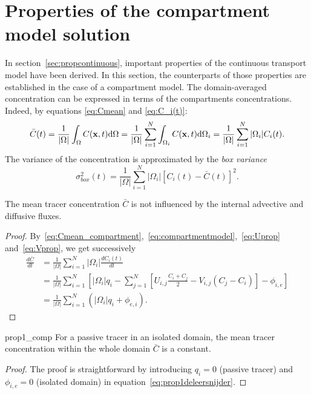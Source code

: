 \section{Properties of the compartment model solution} \label{sec:prop_comp}
In section~\ref{sec:propcontinuous}, important properties of the continuous transport model have been derived. In this section, the counterparts of those properties are established in the case of a compartment model. The domain-averaged concentration can be expressed in terms of the compartments concentrations. Indeed, by equations \eqref{eq:Cmean} and \eqref{eq:C_i(t)}:
\begin{equation} \label{eq:Cmean_compartment}
	\bar{C}(t) = \frac{1}{|\Omega|} \int_\Omega C(\mathbf x,t) \mathrm d\Omega = \frac{1}{|\Omega|} \sum_{i=1}^N \int_{\Omega_i} C(\mathbf x,t) \mathrm d\Omega_i
		= \frac{1}{|\Omega|} \sum_{i=1}^N |\Omega_i| C_i(t).
\end{equation}
The variance of the concentration is approximated by the \textit{box variance}
\begin{equation}
	\sigma_{box}^2(t) = \frac{1}{|\Omega|} \sum_{i=1}^{N} |\Omega_i| \left[C_i(t) - \bar{C}(t)\right]^2.
\end{equation}

\begin{property} \label{prop1_comp}
	The mean tracer concentration $\bar C$ is not influenced by the internal advective and diffusive fluxes.
\end{property}
\begin{proof}
	By~\eqref{eq:Cmean_compartment},~\eqref{eq:compartmentmodel},~\eqref{eq:Uprop} and~\eqref{eq:Vprop}, we get successively
	\begin{subequations}
	\begin{align}
		\frac{d\bar{C}}{dt} &= \frac{1}{|\Omega|} \sum_{i=1}^N |\Omega_i| \frac{dC_i(t)}{dt}\\
			&= \frac{1}{|\Omega|} \sum_{i=1}^N \left[|\Omega_i| q_i - \sum_{j=1}^N \left[ U_{i,j}\frac{C_i + C_j}{2} - V_{i,j} (C_j-C_i)\right] - \phi_{i,e} \right]\\
			&= \frac{1}{|\Omega|} \sum_{i=1}^N(|\Omega_i| q_i + \phi_{e,i}). \label{eq:prop1deleersnijder}
	\end{align}
	\end{subequations}
\end{proof}

\begin{corollary}{prop1_comp} \label{cor:Cmeanconstant}
	For a passive tracer in an isolated domain, the mean tracer concentration within the whole domain $\bar C$ is a constant.
\end{corollary}
\begin{proof}
	The proof is straightforward by introducing $q_i = 0$ (passive tracer) and $\phi_{i,e} = 0$ (isolated domain) in equation~\eqref{eq:prop1deleersnijder}.	
\end{proof}

